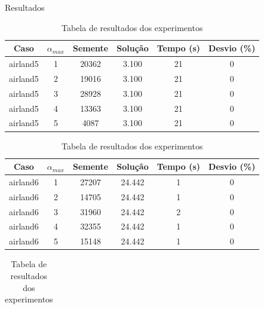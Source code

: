 \documentclass[xcolor=dvipsnames]{beamer}
\begin{document}
\begin{frame}[allowframebreaks]{Resultados}
\begin{table}
\centering

\caption{Tabela de resultados dos experimentos}

\begin{tabular}{|c|c|c|c|c|c|}

\hline %

Caso & $\alpha_{max}$ & Semente & Solução & Tempo (s) & Desvio (\%)  \\


\hline
airland5 & 1 & 20362 & 3.100 & 21 & 0 \\ 
airland5 & 2 & 19016 & 3.100 & 21 & 0 \\ 
airland5 & 3 & 28928 & 3.100 & 21 & 0 \\ 
airland5 & 4 & 13363 & 3.100 & 21 & 0 \\ 
airland5 & 5 & 4087 & 3.100 & 21 & 0 \\ 
\hline

\end{tabular}
\label{tab}
\end{table} 

\begin{table}

\centering

\caption{Tabela de resultados dos experimentos}

\begin{tabular}{|c|c|c|c|c|c|}

\hline %

Caso & $\alpha_{max}$ & Semente & Solução & Tempo (s) & Desvio (\%)  \\

\hline
airland6 & 1 & 27207 & 24.442 & 1 & 0 \\ 
airland6 & 2 & 14705 & 24.442 & 1 & 0 \\ 
airland6 & 3 & 31960 & 24.442 & 2 & 0 \\ 
airland6 & 4 & 32355 & 24.442 & 1 & 0 \\ 
airland6 & 5 & 15148 & 24.442 & 1 & 0 \\ 
\hline

\end{tabular}
\label{tab}
\end{table} 

\begin{table}

\centering

\caption{Tabela de resultados dos experimentos}

\begin{tabular}{|c|c|c|c|c|c|}


\end{tabular}
\end{table}
\end{frame}
\end{document}

